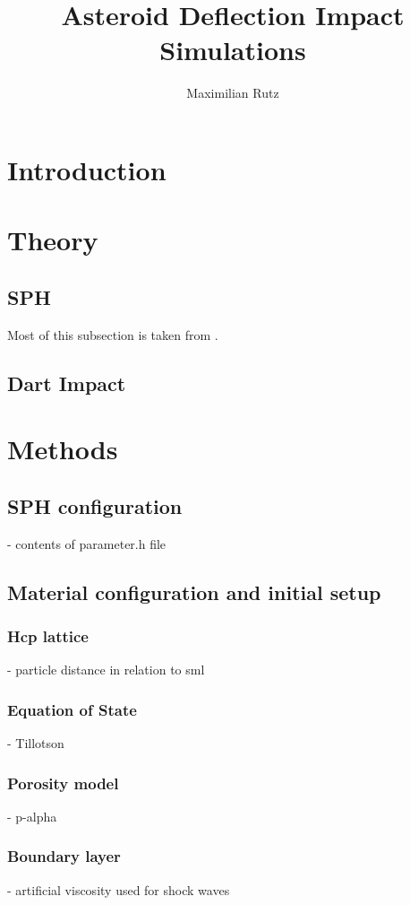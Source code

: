 \documentclass{article}
\title{Asteroid Deflection Impact Simulations}
\author{Maximilian Rutz}
\date{}
\begin{document}
	\maketitle
	\begin{abstract}
	 
	\end{abstract}
	
	\newpage
	\tableofcontents
	 
	\newpage
	\section{Introduction} 
	\section{Theory}
		\subsection{SPH}
			Most of this subsection is taken from \cite{Jutzi_p_alpha_1}.	
		\subsection{Dart Impact}
	\section{Methods}
		\subsection{SPH configuration}
		- contents of parameter.h file
		\subsection{Material configuration and initial setup}
			\subsubsection{Hcp lattice}
			- particle distance in relation to sml
			\subsubsection{Equation of State}
			- Tillotson
			\subsubsection{Porosity model}	
			- p-alpha		
			\subsubsection{Boundary layer}
			- artificial viscosity used for shock waves			
\end{document}
